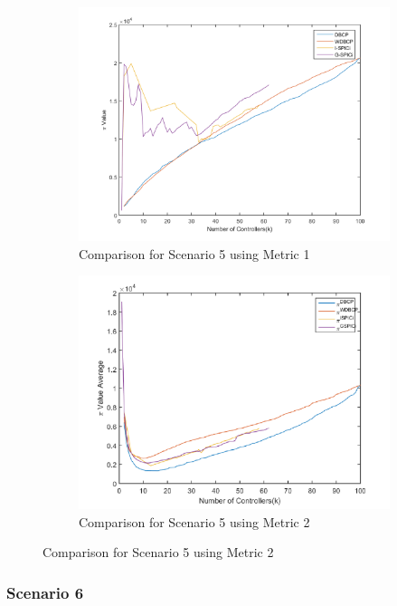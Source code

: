 \documentclass[10pt]{extarticle}
\begin{document}
	\begin{figure}
		\begin{subfigure}{0.5\linewidth}
			\includegraphics[width=\linewidth]{comparison_5.png}
			\caption{Comparison for Scenario 5 using Metric 1}
			\label{fig:comp5}
		\end{subfigure}
		\begin{subfigure}{0.5\linewidth}
			\includegraphics[width=\linewidth]{our_comp_5.png}
			\caption{Comparison for Scenario 5 using Metric 2}
			\label{fig:ourcomp5}
		\end{subfigure}
	\end{figure}
	
	\subsubsection{Scenario 6}
	
\end{document}

